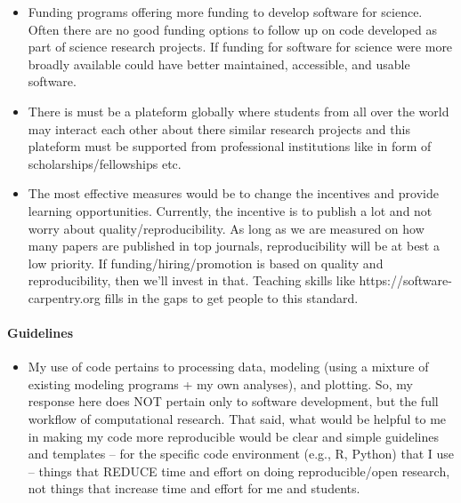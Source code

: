 \documentclass{article}
\begin{document}
\begin{itemize}
	\item Funding programs offering more funding to develop software for science. Often there are no good funding options to follow up on code developed as part of science research projects. If funding for software for science were more broadly available could have better maintained, accessible, and usable software.
	\item There is must be a plateform globally where students from all over the world may interact each other about there similar research projects and this plateform must be supported from professional institutions like in form of scholarships/fellowships etc.
	\item The most effective measures would be to change the incentives and provide learning opportunities. Currently, the incentive is to publish a lot and not worry about quality/reproducibility. As long as we are measured on how many papers are published in top journals, reproducibility will be at best a low priority. If funding/hiring/promotion is based on quality and reproducibility, then we'll invest in that. Teaching skills like https://software-carpentry.org fills in the gaps to get people to this standard.
\end{itemize}

\paragraph{Guidelines}
\begin{itemize}
	\item My use of code pertains to processing data, modeling (using a mixture of existing modeling programs + my own analyses), and plotting. So, my response here does NOT pertain only to software development, but the full workflow of computational research. That said, what would be helpful to me in making my code more reproducible would be clear and simple guidelines and templates -- for the specific code environment (e.g., R, Python) that I use -- things that REDUCE time and effort on doing reproducible/open research, not things that increase time and effort for me and students.
\end{itemize}
\end{document}
